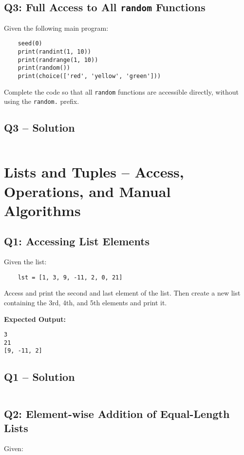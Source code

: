 \documentclass[a4paper,11pt]{article}
\begin{document}
\subsection*{Q3: Full Access to All \texttt{random} Functions}
Given the following main program:

\begin{verbatim}
	seed(0)
	print(randint(1, 10))
	print(randrange(1, 10))
	print(random())
	print(choice(['red', 'yellow', 'green']))
\end{verbatim}

Complete the code so that all \texttt{random} functions are accessible directly, without using the \texttt{random.} prefix.


\subsection*{Q3 – Solution}
\inputminted{python}{Files/6/3.py}
\newpage

\section{Lists and Tuples – Access, Operations, and Manual Algorithms}

\subsection*{Q1: Accessing List Elements}
Given the list:

\begin{verbatim}
	lst = [1, 3, 9, -11, 2, 0, 21]
\end{verbatim}

Access and print the second and last element of the list. Then create a new list containing the 3rd, 4th, and 5th elements and print it.

\textbf{Expected Output:}
\begin{flushleft}
	\texttt{3}\\
	\texttt{21}\\
	\texttt{[9, -11, 2]}
\end{flushleft}

\subsection*{Q1 – Solution}
\inputminted{python}{Files/7/1.py}

\subsection*{Q2: Element-wise Addition of Equal-Length Lists}
Given:
\end{document}
